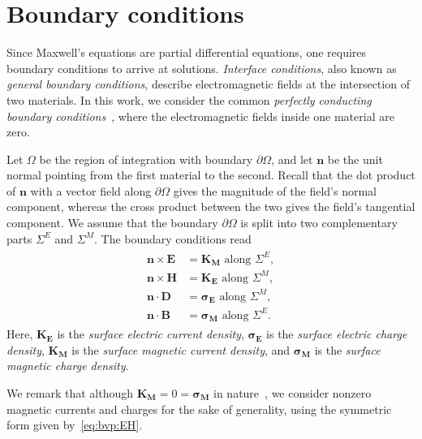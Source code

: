 \documentclass[journal,transmag]{IEEEtran}
\newcommand*\VF[1]{\mathbf{#1}}
\newcommand{\normal}{\mathbf{n}}
\begin{document}
\section{\label{sec:bc} Boundary conditions}
Since Maxwell's equations are partial differential equations, 
one requires boundary conditions to arrive at solutions. 
\emph{Interface conditions}, also known as \emph{general boundary conditions}, describe electromagnetic fields at the intersection of two materials. In this work, we consider the common \emph{perfectly conducting boundary conditions}~\cite{angermann2019semi},
where the electromagnetic fields inside one material are zero.

Let $\Omega$ be the region of integration with boundary $\partial\Omega$, 
and let $\normal$ be the unit normal pointing from the first material to the second.
Recall that the dot product of $\normal$ with a vector field along $\partial\Omega$ gives the magnitude of the field's normal component,
whereas the cross product between the two gives the field's tangential component. 
We assume that the boundary $\partial\Omega$ is split into two complementary parts $\Sigma^{E}$ and $\Sigma^{M}$.
The boundary conditions read 
\begin{align} 
\label{eq:bvp:EH} 
\begin{split}
\normal\times\VF{E}&=\VF{K_M}      \textrm{ along } \Sigma^{E},
	\\
\normal\times\VF{H}&=\VF{K_E}      \textrm{ along } \Sigma^{M},
	\\
\normal\cdot\VF{D}&=\VF{\sigma_E}  \textrm{ along } \Sigma^{M},
	\\
\normal\cdot\VF{B}&=\VF{\sigma_M}  \textrm{ along } \Sigma^{E}.
\end{split}
\end{align} 
Here, 
$\VF{K_E}$ is the \emph{surface electric current density},
$\VF{\sigma_E}$ is the \emph{surface electric charge density},
$\VF{K_M}$ is the \emph{surface magnetic current density},
and
$\VF{\sigma_M}$ is the \emph{surface magnetic charge density}.

We remark that although $\VF{K_M}=0=\VF{\sigma_M}$ in nature~\cite{jackson1999classical,griffiths2005introduction},
we consider nonzero magnetic currents and charges for the sake of generality, using the symmetric form given by~\eqref{eq:bvp:EH}.
\end{document}
